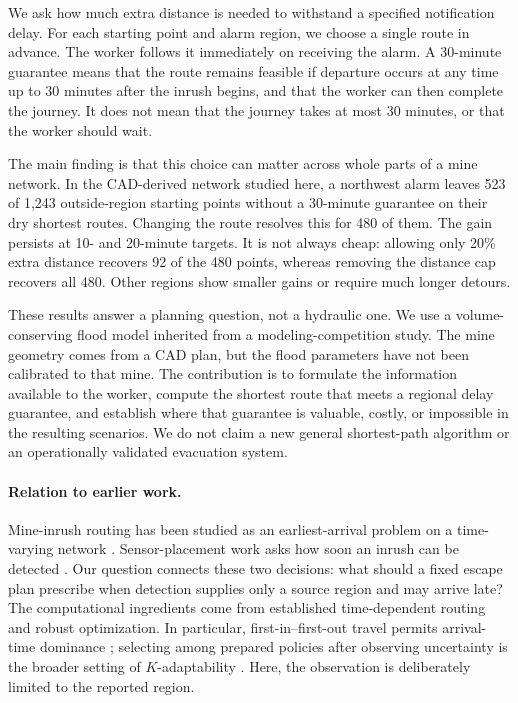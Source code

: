 \documentclass[11pt,a4paper]{article}
\begin{document}
We ask how much extra distance is needed to withstand a specified notification delay. For each starting point and alarm region, we choose a single route in advance. The worker follows it immediately on receiving the alarm. A 30-minute guarantee means that the route remains feasible if departure occurs at any time up to 30 minutes after the inrush begins, and that the worker can then complete the journey. It does not mean that the journey takes at most 30 minutes, or that the worker should wait.

The main finding is that this choice can matter across whole parts of a mine network. In the CAD-derived network studied here, a northwest alarm leaves 523 of 1,243 outside-region starting points without a 30-minute guarantee on their dry shortest routes. Changing the route resolves this for 480 of them. The gain persists at 10- and 20-minute targets. It is not always cheap: allowing only 20\% extra distance recovers 92 of the 480 points, whereas removing the distance cap recovers all 480. Other regions show smaller gains or require much longer detours.

These results answer a planning question, not a hydraulic one. We use a volume-conserving flood model inherited from a modeling-competition study. The mine geometry comes from a CAD plan, but the flood parameters have not been calibrated to that mine. The contribution is to formulate the information available to the worker, compute the shortest route that meets a regional delay guarantee, and establish where that guarantee is valuable, costly, or impossible in the resulting scenarios. We do not claim a new general shortest-path algorithm or an operationally validated evacuation system.

\paragraph{Relation to earlier work.}
Mine-inrush routing has been studied as an earliest-arrival problem on a time-varying network \cite{wu2020}. Sensor-placement work asks how soon an inrush can be detected \cite{wu2021}. Our question connects these two decisions: what should a fixed escape plan prescribe when detection supplies only a source region and may arrive late? The computational ingredients come from established time-dependent routing and robust optimization. In particular, first-in--first-out travel permits arrival-time dominance \cite{kaufman,orda}; selecting among prepared policies after observing uncertainty is the broader setting of $K$-adaptability \cite{hanasusanto}. Here, the observation is deliberately limited to the reported region.
\end{document}
